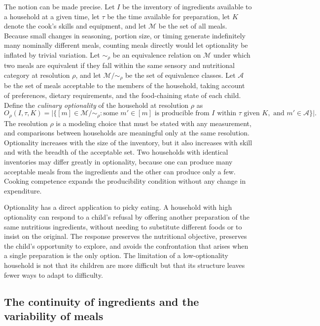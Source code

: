 \documentclass[11pt]{article}
\theoremstyle{remark}
\begin{document}
The notion can be made precise. Let $I$ be the inventory of ingredients available to a household at a given time, let $\tau$ be the time available for preparation, let $K$ denote the cook's skills and equipment, and let $\mathcal{M}$ be the set of all meals. Because small changes in seasoning, portion size, or timing generate indefinitely many nominally different meals, counting meals directly would let optionality be inflated by trivial variation. Let $\sim_\rho$ be an equivalence relation on $\mathcal{M}$ under which two meals are equivalent if they fall within the same sensory and nutritional category at resolution $\rho$, and let $\mathcal{M}/{\sim_\rho}$ be the set of equivalence classes. Let $\mathcal{A}$ be the set of meals acceptable to the members of the household, taking account of preferences, dietary requirements, and the food-chaining state of each child. Define the \emph{culinary optionality} of the household at resolution $\rho$ as
\begin{equation}
O_\rho(I, \tau, K) = \bigl| \{ [m] \in \mathcal{M}/{\sim_\rho} : \text{some } m' \in [m] \text{ is producible from } I \text{ within } \tau \text{ given } K, \text{ and } m' \in \mathcal{A} \} \bigr|.
\end{equation}
The resolution $\rho$ is a modeling choice that must be stated with any measurement, and comparisons between households are meaningful only at the same resolution.
Optionality increases with the size of the inventory, but it also increases with skill and with the breadth of the acceptable set. Two households with identical inventories may differ greatly in optionality, because one can produce many acceptable meals from the ingredients and the other can produce only a few. Cooking competence expands the producibility condition without any change in expenditure.

Optionality has a direct application to picky eating. A household with high optionality can respond to a child's refusal by offering another preparation of the same nutritious ingredients, without needing to substitute different foods or to insist on the original. The response preserves the nutritional objective, preserves the child's opportunity to explore, and avoids the confrontation that arises when a single preparation is the only option. The limitation of a low-optionality household is not that its children are more difficult but that its structure leaves fewer ways to adapt to difficulty.

\subsection{The continuity of ingredients and the variability of meals}
\end{document}
